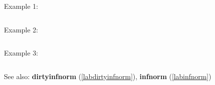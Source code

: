 \noindent Example 1: 
\begin{center}\begin{minipage}{15cm}\begin{Verbatim}[frame=single]
\end{Verbatim}
\end{minipage}\end{center}
\noindent Example 2: 
\begin{center}\begin{minipage}{15cm}\begin{Verbatim}[frame=single]
\end{Verbatim}
\end{minipage}\end{center}
\noindent Example 3: 
\begin{center}\begin{minipage}{15cm}\begin{Verbatim}[frame=single]
\end{Verbatim}
\end{minipage}\end{center}
See also: \textbf{dirtyinfnorm} (\ref{labdirtyinfnorm}), \textbf{infnorm} (\ref{labinfnorm})
